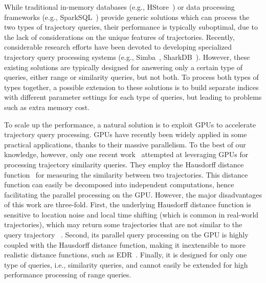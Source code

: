 \documentclass[10pt,conference,letterpaper]{IEEEtran}
\begin{document}
While traditional in-memory databases (e.g., HStore~\cite{DBLP:journals/pvldb/KallmanKNPRZJMSZHA08}) or data processing frameworks (e.g., SparkSQL~\cite{DBLP:conf/sigmod/ArmbrustXLHLBMK15}) provide generic solutions which can process the two types of trajectory queries, their performance is typically suboptimal, due to the lack of considerations on the unique features of trajectories.
Recently, considerable research efforts have been devoted to developing specialized trajectory query processing systems (e.g., Simba~\cite{DBLP:conf/sigmod/XieL0LZG16}, SharkDB~\cite{DBLP:conf/cikm/WangZXZZS14}).
However, these existing solutions are typically designed for answering only a certain type of queries, either range or similarity queries, but not both. To process both types of types together, a possible extension to these solutions is to build separate indices with different parameter settings for each type of queries, but leading to problems such as extra memory cost.

To scale up the performance, a natural solution is to exploit GPUs to accelerate trajectory query processing. GPUs have recently been widely applied in some practical applications, thanks to their massive parallelism.
To the best of our knowledge, however, only one recent work~\cite{DBLP:conf/bigdataconf/LealGZY15} attempted at leveraging GPUs for processing trajectory similarity  queries. They employ the Hausdorff distance function~\cite{munkres2000topology} for measuring the similarity between two trajectories.  This distance function can easily be decomposed into independent computations, hence facilitating the parallel processing on the GPU. However, the major disadvantages of this work are three-fold. First, the underlying Hausdorff distance function is sensitive to location noise and local time shifting (which is common in real-world trajectories), which may return some trajectories that are not similar to the query trajectory ~\cite{EDWP15}. Second, its parallel query processing on the GPU is highly coupled with the Hausdorff distance function, making it inextensible to more realistic distance functions, such as EDR~\cite{DBLP:conf/sigmod/ChenOO05}. Finally, it is designed for only one type of queries, i.e., similarity queries, and cannot easily be extended for high performance processing of range queries.
\end{document}
